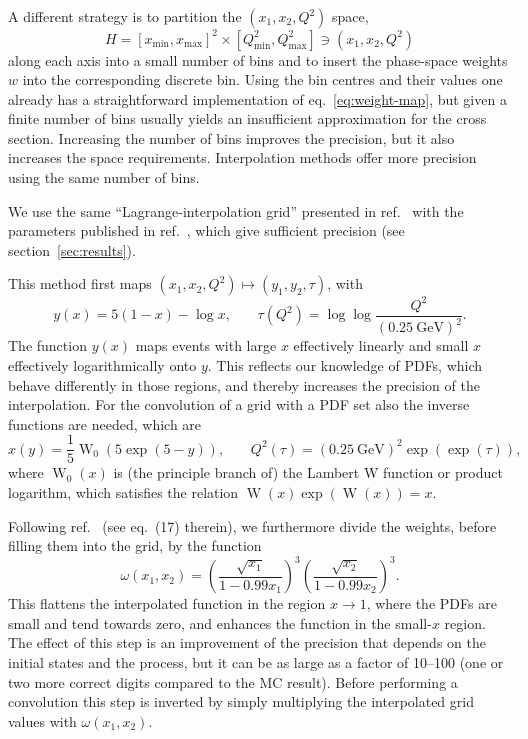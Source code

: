 A different strategy is to partition the $(x_1, x_2, Q^2)$ space,
\begin{equation}
H = [x_\mathrm{min},x_\mathrm{max}]^2 \times [Q^2_\mathrm{min}, Q^2_\mathrm{max}] \ni (x_1, x_2, Q^2)
\end{equation}
along each axis into a small number of bins and to insert the phase-space weights $w$ into the corresponding discrete bin.
Using the bin centres and their values one already has a straightforward implementation of eq.~\eqref{eq:weight-map}, but given a finite number of bins usually yields an insufficient approximation for the cross section.
Increasing the number of bins improves the precision, but it also increases the space requirements.
Interpolation methods offer more precision using the same number of bins.

We use the same \enquote{Lagrange-interpolation grid} presented in ref.~\cite{Carli:2010rw} with the parameters published in ref.~\cite{Bertone:2014zva}, which give sufficient precision (see section~\ref{sec:results}).

This method first maps $(x_1, x_2, Q^2) \mapsto (y_1, y_2, \tau)$, with
\begin{equation}
y(x) = 5 (1-x) - \log x \text{,} \qquad \tau (Q^2) = \log \log \frac{Q^2}{(\SI{0.25}{\giga\electronvolt})^2} \text{.}
\label{eq:maps}
\end{equation}
The function $y(x)$ maps events with large $x$ effectively linearly and small $x$ effectively logarithmically onto $y$.
This reflects our knowledge of PDFs, which behave differently in those regions, and thereby increases the precision of the interpolation.
For the convolution of a grid with a PDF set also the inverse functions are needed, which are
\begin{equation}
x(y) = \frac{1}{5} \operatorname{W}_0 (5 \exp (5-y)) \text{,} \qquad Q^2 (\tau) = (\SI{0.25}{\giga\electronvolt})^2 \exp (\exp (\tau)) \text{,}
\end{equation}
where $\operatorname{W}_0 (x)$ is (the principle branch of) the Lambert W function or product logarithm, which satisfies the relation $\operatorname{W} (x) \exp (\operatorname{W} (x)) = x$.

Following ref.~\cite{Carli:2010rw} (see eq.~(17) therein), we furthermore divide the weights, before filling them into the grid, by the function
\begin{equation}
\omega (x_1, x_2) = \left( \frac{\sqrt{x_1}}{1 - 0.99 x_1} \right)^3 \left( \frac{\sqrt{x_2}}{1 - 0.99 x_2} \right)^3 \text{.}
\end{equation}
This flattens the interpolated function in the region $x \to 1$, where the PDFs are small and tend towards zero, and enhances the function in the small-$x$ region.
The effect of this step is an improvement of the precision that depends on the initial states and the process, but it can be as large as a factor of \numrange{10}{100} (one or two more correct digits compared to the MC result).
Before performing a convolution this step is inverted by simply multiplying the interpolated grid values with $\omega (x_1, x_2)$.

